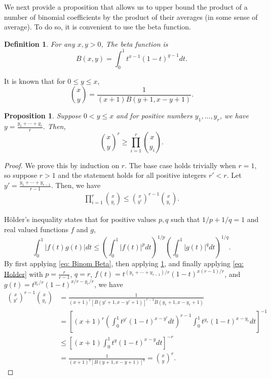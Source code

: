 \documentclass[11pt]{article}
\theoremstyle{plain}
\newtheorem{prop}[thm]{Proposition}
\newtheorem{definition}[thm]{Definition}
\begin{document}
We next provide a proposition that allows us to upper bound the product of a number of binomial coefficients by the product of their averages (in some sense of average). To do so, it is convenient to use the beta function.

\begin{definition}\label{def: Beta}
    For any $x,y > 0$, The beta function is 
    \[
    B(x,y) = \int_{0}^1t^{x - 1}(1 - t)^{y  - 1}dt.
    \]
\end{definition}
It is known that for $0 \leq  y \leq x$, 
\begin{equation}\label{eq: Binom Beta}
    \binom{x}{y} = \frac{1}{(x+1)B(y+1, x - y + 1)}.
\end{equation}



\begin{prop}\label{prop: binom average}
    Suppose $0 < y \leq x$ and for positive numbers $y_1, \ldots, y_r$, we have $y = \frac{y_1 + \cdots + y_r}{r}$. Then, 
    \[
        \binom{x}{y}^r \geq \prod_{i = 1}^r \binom{x}{y_i}.
    \]
\end{prop}
\begin{proof}
    We prove this by induction on $r$. The base case holds trivially when $r = 1$, so suppose $r > 1$ and the statement holds for all positive integers $r' < r$. Let $y' = \frac{y_1 + \cdots + y_{r-1}}{r-1}$. Then, we have 
    \begin{align*}
        \prod_{i = 1}^r \binom{x}{y_i} \leq \binom{x}{y'}^{r-1}\binom{x}{y_r}.
    \end{align*}
    
    H\"older's inequality states that for positive values $p,q$ such that $1/p + 1/q = 1$ and real valued functions $f$ and $g$, 
    \begin{equation}\label{eq: Holder}
        \int_{0}^1|f(t)g(t)|dt \leq \left(\int_{0}^1|f(t)|^pdt\right)^{1/p}\left(\int_{0}^1|g(t)|^qdt\right)^{1/q}.
    \end{equation}
    By first applying \eqref{eq: Binom Beta}, then applying \cref{def: Beta}, and finally applying \eqref{eq: Holder} with $p = \frac{r}{r-1}$, $q = r$, $f(t) = t^{(y_1 + \cdots + y_{r-1})/{r}}(1-t)^{x(r-1)/r}$, and $g(t)= t^{y_r/r}(1-t)^{x/r - y_r/r}$, we have
    \begin{align*}
        \binom{x}{y'}^{r-1}\binom{x}{y_r} &= \frac{1}{(x+1)^r[B(y' + 1, x - y' + 1)]^{r-1}B(y_r + 1, x - y_r + 1)} \\
        &= \left[(x+1)^r\left(\int_0^1t^{y'}(1-t)^{x - y'}dt\right)^{r-1}\int_0^1t^{y_r}(1-t)^{x-y_r}dt\right]^{-1}\\
        &\leq \left[(x+1)\int_0^1t^y(1-t)^{x-y}dt\right]^{-r}\\
        &= \frac{1}{(x+1)^q[B(y+1, x - y+1)]^q} = \binom{x}{y}^r.
    \end{align*}
\end{proof}
\end{document}
